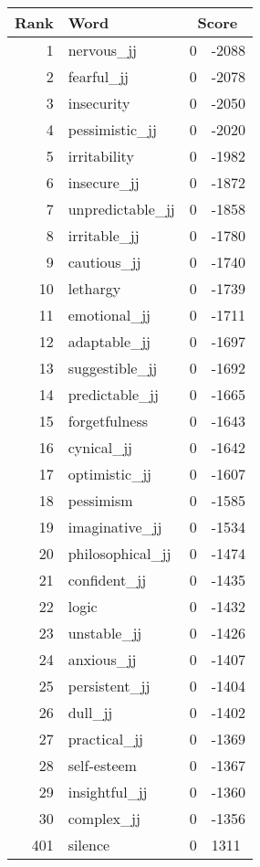 \begin{longtable}[!htbp]{| rlr@{.}l |}
    \hline
    \textbf{Rank} & \textbf{Word} & \multicolumn{2}{c|}{\textbf{Score}} \\
    \hline
    \endhead
    1 & nervous\_jj & 0 & -2088 \\
    2 & fearful\_jj & 0 & -2078 \\
    3 & insecurity & 0 & -2050 \\
    4 & pessimistic\_jj & 0 & -2020 \\
    5 & irritability & 0 & -1982 \\
    6 & insecure\_jj & 0 & -1872 \\
    7 & unpredictable\_jj & 0 & -1858 \\
    8 & irritable\_jj & 0 & -1780 \\
    9 & cautious\_jj & 0 & -1740 \\
    10 & lethargy & 0 & -1739 \\
    11 & emotional\_jj & 0 & -1711 \\
    12 & adaptable\_jj & 0 & -1697 \\
    13 & suggestible\_jj & 0 & -1692 \\
    14 & predictable\_jj & 0 & -1665 \\
    15 & forgetfulness & 0 & -1643 \\
    16 & cynical\_jj & 0 & -1642 \\
    17 & optimistic\_jj & 0 & -1607 \\
    18 & pessimism & 0 & -1585 \\
    19 & imaginative\_jj & 0 & -1534 \\
    20 & philosophical\_jj & 0 & -1474 \\
    21 & confident\_jj & 0 & -1435 \\
    22 & logic & 0 & -1432 \\
    23 & unstable\_jj & 0 & -1426 \\
    24 & anxious\_jj & 0 & -1407 \\
    25 & persistent\_jj & 0 & -1404 \\
    26 & dull\_jj & 0 & -1402 \\
    27 & practical\_jj & 0 & -1369 \\
    28 & self-esteem & 0 & -1367 \\
    29 & insightful\_jj & 0 & -1360 \\
    30 & complex\_jj & 0 & -1356 \\
    401 & silence & 0 & 1311 \\

\end{longtable}
